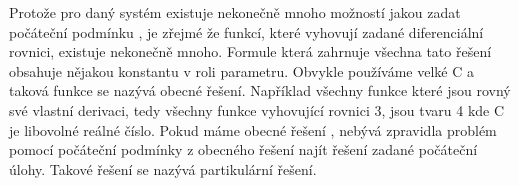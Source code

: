 Protože pro daný systém existuje nekonečně mnoho možností jakou zadat počáteční podmínku , je zřejmé že funkcí,  které vyhovují zadané diferenciální rovnici, existuje nekonečně mnoho. Formule která zahrnuje všechna tato řešení obsahuje nějakou konstantu v roli parametru. Obvykle používáme velké C a taková funkce se nazývá obecné řešení. Například všechny funkce které jsou rovný své vlastní derivaci, tedy všechny funkce vyhovující rovnici 3, jsou tvaru 4 kde C je libovolné reálné číslo. Pokud máme obecné řešení , nebývá zpravidla problém pomocí počáteční podmínky z obecného řešení najít řešení zadané počáteční úlohy. Takové řešení se nazývá partikulární řešení.
